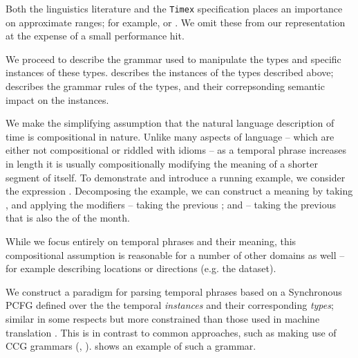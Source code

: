 Both the linguistics literature and the \texttt{Timex} specification
	places an importance on approximate ranges;
	for example,  or .
We omit these from our representation at the expense of a small performance
	hit.

We proceed to describe the grammar used to manipulate the types and specific
	instances of these types.
 describes the instances of the types described
	above;  describes the grammar rules of the types,
	and their correpsonding semantic impact on the instances.

We make the simplifying assumption that the natural language description
	of time is compositional in nature.
Unlike many aspects of language  -- which are either not compositional or
	riddled with idioms -- as a temporal phrase increases in length it is
	usually compositionally modifying the meaning of a shorter segment of itself.
To demonstrate and introduce a running example, we consider the expression
	.
Decomposing the example, we can construct a meaning by taking ,
	and applying the modifiers  -- taking the previous ;
	and  -- taking the previous  that is
	also the  of the month.

While we focus entirely on temporal phrases and their meaning, this
	compositional assumption is reasonable for a number of other domains as 
	well -- for example describing locations or directions (e.g. the 
	 dataset).

We construct a paradigm for parsing temporal phrases based on a Synchronous
	PCFG defined over the the temporal \textit{instances} and their
	corresponding \textit{types}; similar in some respects but more
	constrained than those used in machine translation 
	\cite{key:2001yamada-syntaxmt}.
This is in contrast to common approaches, such as making use of CCG 
	grammars (, ).
 shows an example of such a grammar.

